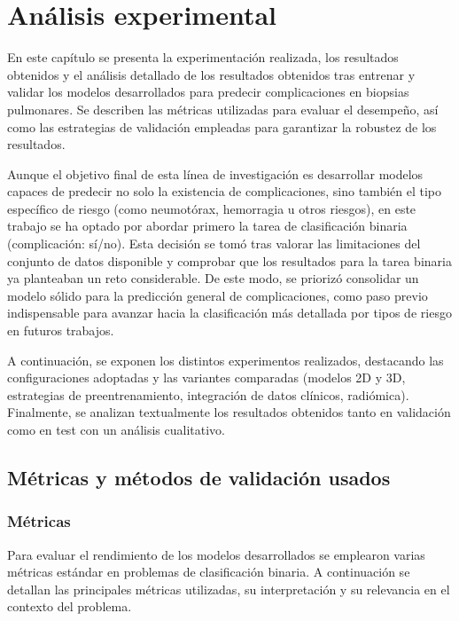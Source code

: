 
\chapter{Análisis experimental} \label{analisis-resultados}

En este capítulo se presenta la experimentación realizada, los resultados obtenidos y el análisis detallado de los resultados obtenidos tras entrenar y validar los modelos desarrollados para predecir complicaciones en biopsias pulmonares. Se describen las métricas utilizadas para evaluar el desempeño, así como las estrategias de validación empleadas para garantizar la robustez de los resultados.  

Aunque el objetivo final de esta línea de investigación es desarrollar modelos capaces de predecir no solo la existencia de complicaciones, sino también el tipo específico de riesgo (como neumotórax, hemorragia u otros riesgos), en este trabajo se ha optado por abordar primero la tarea de clasificación binaria (complicación: sí/no). Esta decisión se tomó tras valorar las limitaciones del conjunto de datos disponible y comprobar que los resultados para la tarea binaria ya planteaban un reto considerable. De este modo, se priorizó consolidar un modelo sólido para la predicción general de complicaciones, como paso previo indispensable para avanzar hacia la clasificación más detallada por tipos de riesgo en futuros trabajos.  

A continuación, se exponen los distintos experimentos realizados, destacando las configuraciones adoptadas y las variantes comparadas (modelos 2D y 3D, estrategias de preentrenamiento, integración de datos clínicos, radiómica). Finalmente, se analizan textualmente los resultados obtenidos tanto en validación como en test con un análisis cualitativo.

\section{Métricas y métodos de validación usados}

\subsection{Métricas}

Para evaluar el rendimiento de los modelos desarrollados se emplearon varias métricas estándar en problemas de clasificación binaria. A continuación se detallan las principales métricas utilizadas, su interpretación y su relevancia en el contexto del problema.

